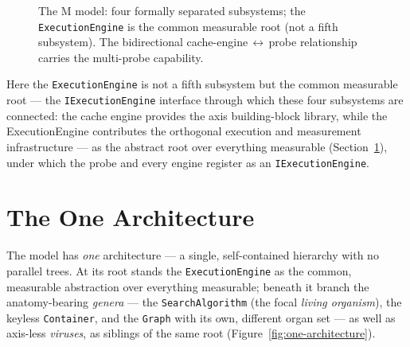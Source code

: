 \begin{figure}[!htbp]
  \centering
  \caption{The M model: four formally separated subsystems; the \texttt{ExecutionEngine} is the
  common measurable root (not a fifth subsystem). The bidirectional
  cache-engine\,$\leftrightarrow$\,probe relationship carries the multi-probe capability.}\label{fig:m-model}
\end{figure}

Here the \texttt{ExecutionEngine} is not a fifth subsystem but the common measurable root --- the
\texttt{IExecutionEngine} interface through which these four subsystems are connected: the cache
engine provides the axis building-block library, while the ExecutionEngine contributes the
orthogonal execution and measurement infrastructure --- as the abstract root over everything
measurable (Section~\ref{sec:three-layer}), under which the probe and every engine register as an
\texttt{IExecutionEngine}.

\section{The One Architecture}\label{sec:three-layer}

The model has \emph{one} architecture --- a single, self-contained hierarchy with no parallel trees.
At its root stands the \texttt{ExecutionEngine} as the common, measurable abstraction over
everything measurable; beneath it branch the anatomy-bearing \emph{genera} --- the \texttt{SearchAlgorithm}
(the focal \emph{living organism}), the keyless \texttt{Container}, and the \texttt{Graph} with its own,
different organ set --- as well as axis-less \emph{viruses}, as siblings of the
same root (Figure~\ref{fig:one-architecture}).

